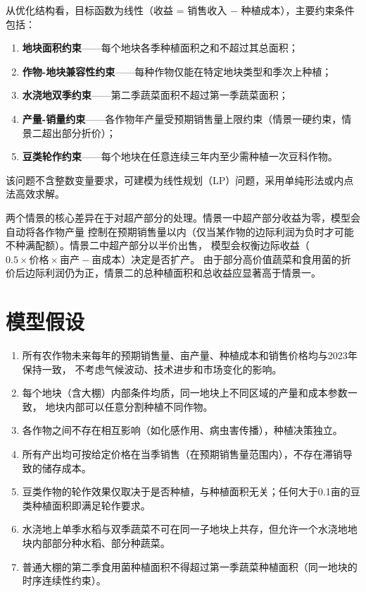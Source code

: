\documentclass[12pt,a4paper]{ctexart}
\begin{document}
从优化结构看，目标函数为线性（收益 = 销售收入 $-$ 种植成本），主要约束条件包括：
\begin{enumerate}[label=(\arabic*)]
    \item \textbf{地块面积约束}——每个地块各季种植面积之和不超过其总面积；
    \item \textbf{作物-地块兼容性约束}——每种作物仅能在特定地块类型和季次上种植；
    \item \textbf{水浇地双季约束}——第二季蔬菜面积不超过第一季蔬菜面积；
    \item \textbf{产量-销量约束}——各作物年产量受预期销售量上限约束（情景一硬约束，情景二超出部分折价）；
    \item \textbf{豆类轮作约束}——每个地块在任意连续三年内至少需种植一次豆科作物。
\end{enumerate}
该问题不含整数变量要求，可建模为线性规划（LP）问题，采用单纯形法或内点法高效求解。

两个情景的核心差异在于对超产部分的处理。情景一中超产部分收益为零，模型会自动将各作物产量
控制在预期销售量以内（仅当某作物的边际利润为负时才可能不种满配额）。情景二中超产部分以半价出售，
模型会权衡边际收益（$0.5 \times \text{价格} \times \text{亩产} - \text{亩成本}$）决定是否扩产。
由于部分高价值蔬菜和食用菌的折价后边际利润仍为正，情景二的总种植面积和总收益应显著高于情景一。

\section{模型假设}

\begin{enumerate}[label=\textbf{假设\arabic*}：,leftmargin=*]
    \item 所有农作物未来每年的预期销售量、亩产量、种植成本和销售价格均与2023年保持一致，
          不考虑气候波动、技术进步和市场变化的影响。
    \item 每个地块（含大棚）内部条件均质，同一地块上不同区域的产量和成本参数一致，
          地块内部可以任意分割种植不同作物。
    \item 各作物之间不存在相互影响（如化感作用、病虫害传播），种植决策独立。
    \item 所有产出均可按给定价格在当季销售（在预期销售量范围内），不存在滞销导致的储存成本。
    \item 豆类作物的轮作效果仅取决于是否种植，与种植面积无关；任何大于0.1亩的豆类种植面积即满足轮作要求。
    \item 水浇地上单季水稻与双季蔬菜不可在同一子地块上共存，但允许一个水浇地地块内部部分种水稻、部分种蔬菜。
    \item 普通大棚的第二季食用菌种植面积不得超过第一季蔬菜种植面积（同一地块的时序连续性约束）。
\end{enumerate}
\end{document}
